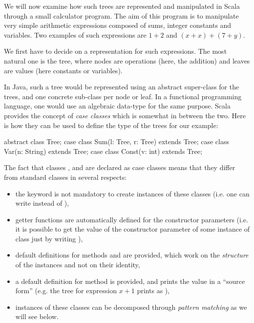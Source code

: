 \documentclass[a4paper,12pt,twoside,titlepage]{article}
\newcommand{\langname}[1]{#1\xspace}
\newcommand{\Scala}{\langname{Scala}}
\newcommand{\Java}{\langname{Java}}
\begin{document}
We will now examine how such trees are represented and manipulated in
\Scala through a small calculator program. The aim of this program is
to manipulate very simple arithmetic expressions composed of sums,
integer constants and variables. Two examples of such expressions are
$1+2$ and $(x+x)+(7+y)$.

We first have to decide on a representation for such expressions. The
most natural one is the tree, where nodes are operations (here, the
addition) and leaves are values (here constants or variables).

In \Java, such a tree would be represented using an abstract
super-class for the trees, and one concrete sub-class per node or
leaf. In a functional programming language, one would use an algebraic
data-type for the same purpose. \Scala provides the concept of
\emph{case classes} which is somewhat in between the two. Here is how
they can be used to define the type of the trees for our example:
\begin{scalacode}
abstract class Tree;
case class Sum(l: Tree, r: Tree) extends Tree;
case class Var(n: String) extends Tree;
case class Const(v: int) extends Tree;
\end{scalacode}
The fact that classes ,  and  are
declared as case classes means that they differ from standard classes
in several respects:
\begin{itemize}
\item the  keyword is not mandatory to create instances of
  these classes (i.e. one can write  instead of
  ),
\item getter functions are automatically defined for the constructor
  parameters (i.e. it is possible to get the value of the 
  constructor parameter of some instance  of class
   just by writing ),
\item default definitions for methods  and
   are provided, which work on the \emph{structure} of
  the instances and not on their identity,
\item a default definition for method  is provided, and
  prints the value in a ``source form'' (e.g. the tree for expression
  $x+1$ prints as ),
\item instances of these classes can be decomposed through
  \emph{pattern matching} as we will see below.
\end{itemize}
\end{document}
